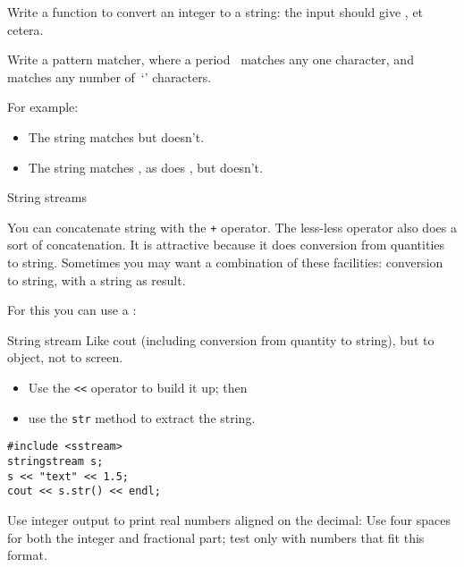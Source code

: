 \begin{exercise}
  \label{ex:printnumber}
  Write a function to convert an integer to a string: the input
   should give , et cetera.
\end{exercise}

\begin{exercise}
  Write a pattern matcher, where a period~ matches any one
  character, and  matches any number of~`' characters.

  For example:
  \begin{itemize}
  \item The string  matches  but  doesn't.
  \item The string  matches , as does , but
     doesn't.
  \end{itemize}
\end{exercise}

 {String streams}

You can concatenate string with the \lstinline{+} operator.
The less-less operator also does a sort of concatenation. It is
attractive because it does conversion from quantities to string.
Sometimes you may want a combination of these facilities: conversion
to string, with a string as result.

For this you can use a : 

\begin{block}{String stream}
  \label{sl:sstream}
  Like cout (including conversion from quantity to string), but to
  object, not to screen.
\begin{itemize}
\item Use the \lstinline{<<} operator to build it up; then
\item use the \lstinline{str} method to extract the string.
\end{itemize}
\begin{lstlisting}
#include <sstream>
stringstream s;
s << "text" << 1.5;
cout << s.str() << endl;
\end{lstlisting}
\end{block}

\begin{exercise}
  \label{ex:fixedpout}
  Use integer output to print real numbers aligned on the
  decimal:
  Use four spaces for both the integer and fractional part; test only
  with numbers that fit this format.
\end{exercise}

